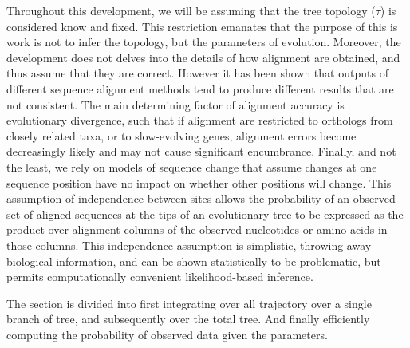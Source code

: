 Throughout this development, we will be assuming that the tree topology ($\tau$) is considered know and fixed.
This restriction emanates that the purpose of this is work is not to infer the topology, but the parameters of evolution.
Moreover, the development does not delves into the details of how alignment are obtained, and thus assume that they are correct.
However it has been shown that outputs of different sequence alignment methods tend to produce different results that are not consistent.
The main determining factor of alignment accuracy is evolutionary divergence, such that if alignment are restricted to orthologs from closely related taxa, or to slow-evolving genes, alignment errors become decreasingly likely and may not cause significant encumbrance.
Finally, and not the least, we rely on models of sequence change that assume changes at one sequence position have no impact on whether other positions will change.
This assumption of independence between sites allows the probability of an observed set of aligned sequences at the tips of an evolutionary tree to be expressed as the product over alignment columns of the observed nucleotides or amino acids in those columns. 
This independence assumption is simplistic, throwing away biological information, and can be shown statistically to be problematic, but permits computationally convenient likelihood-based inference.

The section is divided into first integrating over all trajectory over a single branch of tree, and subsequently over the total tree. And finally efficiently computing the probability of observed data given the parameters.

